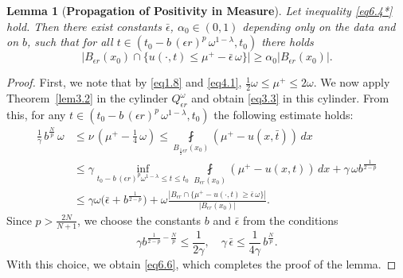 \documentclass[a4paper,11pt,fullpage]{article}
\numberwithin{equation}{section}
\newtheorem{lemma}{Lemma}[section]
\begin{document}
\begin{lemma}[\bf Propagation of Positivity in Measure]\label{lem6.1}
Let inequality \eqref{eq6.4*} hold. Then there exist constants $\bar{\epsilon}$, $\alpha_0\in (0, 1)$ depending only on the data and on $b$, such that for all $t\in(t_0-b \,(\epsilon r)^{p}\,\omega^{1-\lambda},t_0)$ there holds
\begin{equation}\label{eq6.6}
\big|B_{\epsilon r}(x_0)\cap\big\{u(\cdot, t)\leqslant \mu^+-\bar{\epsilon}\,\omega\big\}\big|\geqslant \alpha_0\big|B_{\epsilon r}(x_0)\big|.
\end{equation}
\end{lemma}
\begin{proof}
First, we note that by \eqref{eq1.8} and \eqref{eq4.1}, $\frac{1}{2}\omega\leqslant \mu^+\leqslant 2 \omega$. We now apply Theorem~\ref{lem3.2} in the cylinder $Q^{\omega}_{\epsilon r}$ and obtain \eqref{eq3.3} in this cylinder. From this, for any $t\in(t_0-b\,(\epsilon r)^{p}\,\omega^{1-\lambda}, t_0)$ the following estimate holds:
\begin{equation*}
\begin{aligned}
\frac{1}{\gamma}\,b^{\frac{N}{p}}\,\omega&\leqslant \nu\,(\mu^+-\frac{1}{4}\,\omega)\leqslant \fint\limits_{B_{\frac{1}{2}\epsilon r}(x_0)}(\mu^+-u(x, \bar{t}))\,dx
\\&\leqslant\gamma \inf\limits_{t_0-b\,(\epsilon r)^{p} \omega^{1-\lambda}\leqslant t \leqslant t_0}\fint\limits_{B_{\epsilon r}(x_0)}(\mu^+-u(x, t))\,dx
+\gamma\,\omega b^{\frac{1}{2-p}}
\\&\leqslant \gamma \omega \Big(\bar{\epsilon}+b^{\frac{1}{2-p}}\Big)+\omega\frac{|B_{\epsilon r}\cap\{\mu^+-u(\cdot, t)\geqslant \bar{\epsilon}\,\omega\}|}{|B_{\epsilon r}(x_0)|}.
\end{aligned}
\end{equation*}
Since $p>\frac{2N}{N+1}$, we choose the constants $b$ and $\bar{\epsilon}$ from the conditions
$$\gamma b^{\frac{1}{2-p}-\frac{N}{p}}\leqslant \frac{1}{2\gamma},\quad  \gamma \,\bar{\epsilon}\leqslant \frac{1}{4\gamma}\,b ^{\frac{N}{p}}.$$
With this choice, we obtain \eqref{eq6.6}, which completes the proof of the lemma.
\end{proof}
\end{document}
